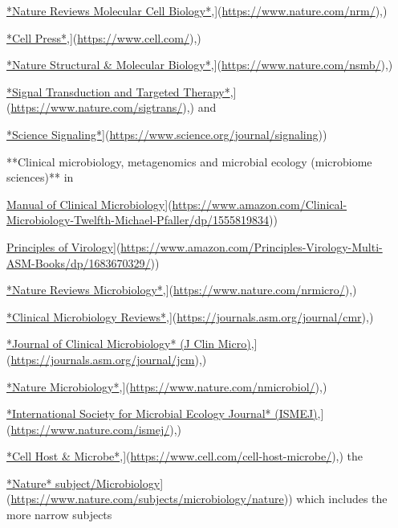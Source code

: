 \documentclass[
]{book}
\begin{document}
\href{\%5Bhttps://www.nature.com/nrm/}{*Nature Reviews Molecular Cell Biology*},{]}(\url{https://www.nature.com/nrm/}),)

\href{\%5Bhttps://www.cell.com/}{*Cell Press*},{]}(\url{https://www.cell.com/}),)

\href{\%5Bhttps://www.nature.com/nsmb/}{*Nature Structural \& Molecular Biology*},{]}(\url{https://www.nature.com/nsmb/}),)

\href{\%5Bhttps://www.nature.com/sigtrans/}{*Signal Transduction and Targeted Therapy*},{]}(\url{https://www.nature.com/sigtrans/}),) and

\href{\%5Bhttps://www.science.org/journal/signaling}{*Science Signaling*}{]}(\url{https://www.science.org/journal/signaling}))

**Clinical microbiology, metagenomics and microbial ecology (microbiome sciences)** in

\href{\%5Bhttps://www.amazon.com/Clinical-Microbiology-Twelfth-Michael-Pfaller/dp/1555819834}{Manual of Clinical Microbiology}{]}(\url{https://www.amazon.com/Clinical-Microbiology-Twelfth-Michael-Pfaller/dp/1555819834}))

\href{\%5Bhttps://www.amazon.com/Principles-Virology-Multi-ASM-Books/dp/1683670329/}{Principles of Virology}{]}(\url{https://www.amazon.com/Principles-Virology-Multi-ASM-Books/dp/1683670329/}))

\href{\%5Bhttps://www.nature.com/nrmicro/}{*Nature Reviews Microbiology*},{]}(\url{https://www.nature.com/nrmicro/}),)

\href{\%5Bhttps://journals.asm.org/journal/cmr}{*Clinical Microbiology Reviews*},{]}(\url{https://journals.asm.org/journal/cmr}),)

\href{\%5Bhttps://journals.asm.org/journal/jcm}{*Journal of Clinical Microbiology* (J Clin Micro)},{]}(\url{https://journals.asm.org/journal/jcm}),)

\href{\%5Bhttps://www.nature.com/nmicrobiol/}{*Nature Microbiology*},{]}(\url{https://www.nature.com/nmicrobiol/}),)

\href{\%5Bhttps://www.nature.com/ismej/}{*International Society for Microbial Ecology Journal* (ISMEJ)},{]}(\url{https://www.nature.com/ismej/}),)

\href{\%5Bhttps://www.cell.com/cell-host-microbe/}{*Cell Host \& Microbe*},{]}(\url{https://www.cell.com/cell-host-microbe/}),) the

\href{\%5Bhttps://www.nature.com/subjects/microbiology/nature}{*Nature* subject/Microbiology}{]}(\url{https://www.nature.com/subjects/microbiology/nature})) which includes the more narrow subjects
\end{document}
